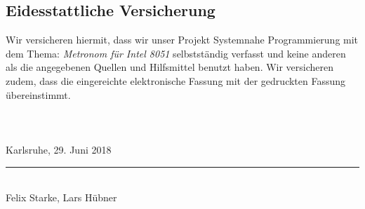 \documentclass[a4paper, 12pt]{scrartcl}
\def \autoren {Felix Starke, Lars Hübner} %
\def \titel {Metronom für Intel 8051}
\def \arbeit {Projekt Systemnahe Programmierung}
\begin{document}
\begin{onehalfspace}
\section{Eidesstattliche Versicherung}
Wir versicheren hiermit, dass wir unser {\arbeit} mit dem Thema: {\itshape \titel } selbstständig verfasst und keine anderen als die angegebenen Quellen und Hilfsmittel benutzt haben. Wir versicheren zudem, dass die eingereichte elektronische Fassung mit der gedruckten Fassung übereinstimmt. 
\\
\\
\\
\\
\vspace{3em}
Karlsruhe, 29. Juni 2018
\vspace{4em}
\\
\rule{10cm}{0.4pt}\\
\autoren

\end{onehalfspace}
\end{document}
